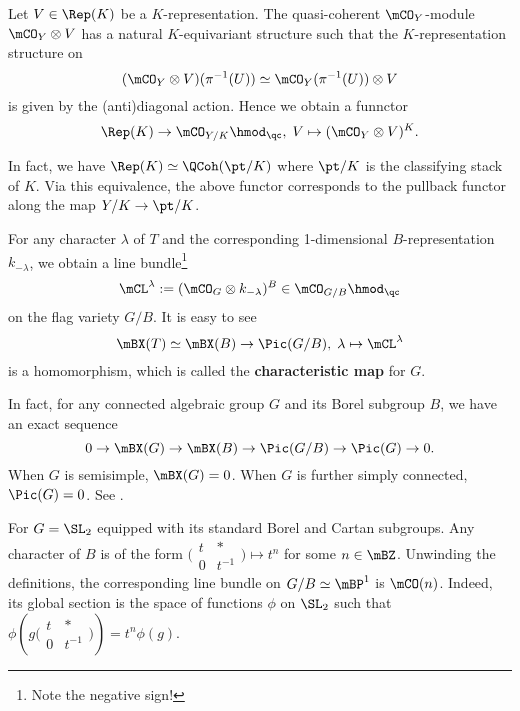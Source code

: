 	

	

	\begin{constr}
		Let $V\in \Rep(K)$ be a $K$-representation. The quasi-coherent $\mCO_Y$-module $\mCO_Y \ot V$ has a natural $K$-equivariant structure such that the $K$-representation structure on
		\[
			(\mCO_Y \ot V)(\pi^{-1}(U))  \simeq \mCO_Y(\pi^{-1}(U)) \ot V
		\]
		is given by the (anti)diagonal action. Hence we obtain a funnctor
		\[
			\Rep(K) \to \mCO_{Y/K} \hmod_\qc,\; V\mapsto (\mCO_Y \ot V)^K.
		\]
	\end{constr}

	\begin{rem}
		In fact, we have $\Rep(K)\simeq \QCoh(\pt/K)$ where $\pt/K$ is the classifying stack of $K$. Via this equivalence, the above functor corresponds to the pullback functor along the map $Y/K \to \pt/K$.
	\end{rem}

	\begin{constr}
		For any character $\lambda$ of $T$ and the corresponding 1-dimensional $B$-representation $k_{-\lambda}$, we obtain a line bundle\footnote{Note the negative sign!}
		\[
			\mCL^\lambda:= (\mCO_G\ot k_{-\lambda})^B \in \mCO_{G/B}\hmod_\qc
		\]
		on the flag variety $G/B$. It is easy to see
		\begin{equation}
			\label{eqn-character-to-line-bundle}
			\mBX(T)\simeq \mBX(B) \to \Pic(G/B),\; \lambda \mapsto \mCL^\lambda
		\end{equation}
		is a homomorphism, which is called the \textbf{characteristic map} for $G$.
	\end{constr}

	\begin{rem}
		In fact, for any connected algebraic group $G$ and its Borel subgroup $B$, we have an exact sequence
		\[
			0 \to \mBX(G) \to \mBX(B) \to  \Pic(G/B) \to \Pic(G) \to 0.
		\]
		When $G$ is semisimple, $\mBX(G)=0$. When $G$ is further simply connected, $\Pic(G) = 0$. See \cite[Section 18]{M}.

	\end{rem}

	

	\begin{exam}
		For $G=\SL_2$ equipped with its standard Borel and Cartan subgroups. Any character of $B$ is of the form $\big(\begin{smallmatrix} t & *\\ 0 & t^{-1} \end{smallmatrix}\big)\mapsto t^n$ for some $n\in \mBZ$. Unwinding the definitions, the corresponding line bundle on $G/B\simeq \mBP^1$ is $\mCO(n)$. Indeed, its global section is the space of functions $\phi$ on $\SL_2$ such that $\phi(g\big(\begin{smallmatrix} t & *\\ 0 & t^{-1} \end{smallmatrix}\big))=t^n\phi(g)$.
	\end{exam}

